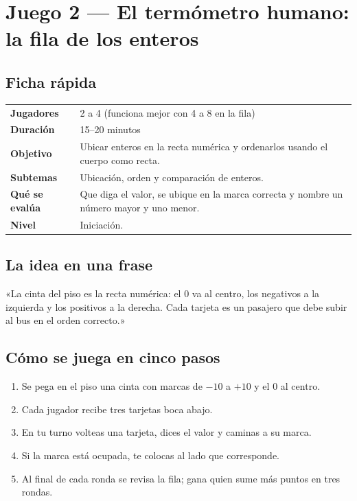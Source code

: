 \documentclass[12pt, letterpaper]{article}
\begin{document}
\clearpage
\section{Juego 2 — El termómetro humano: la fila de los enteros}

\subsection{Ficha rápida}

\begin{center}
\small
\begin{tabular}{@{}p{3cm} p{12.2cm}@{}}
\toprule
\textbf{Jugadores} & 2 a 4 (funciona mejor con 4 a 8 en la fila)\\
\textbf{Duración} & 15--20 minutos\\
\textbf{Objetivo} & Ubicar enteros en la recta numérica y ordenarlos usando el cuerpo como recta.\\
\textbf{Subtemas} & Ubicación, orden y comparación de enteros.\\
\textbf{Qué se evalúa} & Que diga el valor, se ubique en la marca correcta y nombre un número mayor y uno menor.\\
\textbf{Nivel} & Iniciación.\\
\bottomrule
\end{tabular}
\end{center}

\subsection{La idea en una frase}

\begin{cuadroextra}
  «La cinta del piso es la recta numérica: el $0$ va al centro, los negativos a la izquierda y los positivos a la derecha. Cada tarjeta es un pasajero que debe subir al bus en el orden correcto.»
\end{cuadroextra}

\subsection{Cómo se juega en cinco pasos}

\begin{enumerate}[leftmargin=*]
  \item Se pega en el piso una cinta con marcas de $-10$ a $+10$ y el $0$ al centro.
  \item Cada jugador recibe tres tarjetas boca abajo.
  \item En tu turno volteas una tarjeta, dices el valor y caminas a su marca.
  \item Si la marca está ocupada, te colocas al lado que corresponde.
  \item Al final de cada ronda se revisa la fila; gana quien sume más puntos en tres rondas.
\end{enumerate}
\end{document}
